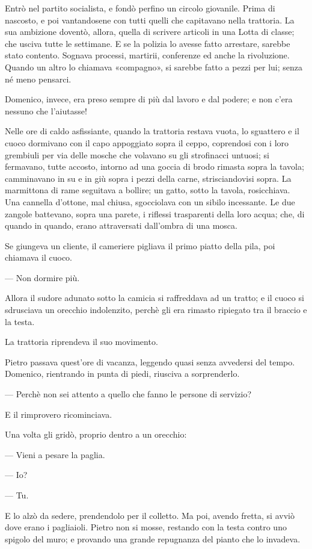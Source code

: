 Entrò nel partito socialista, e fondò perfino un circolo giovanile. Prima di nascosto, e poi vantandosene con tutti quelli che capitavano nella trattoria. La sua ambizione doventò, allora, quella di scrivere articoli in una Lotta di classe; che usciva tutte le settimane. E se la polizia lo avesse fatto arrestare, sarebbe stato contento. Sognava processi, martirii, conferenze ed anche la rivoluzione. Quando un altro lo chiamava «compagno», si sarebbe fatto a pezzi per lui; senza né meno pensarci.

Domenico, invece, era preso sempre di più dal lavoro e dal podere; e non c’era nessuno che l’aiutasse!

Nelle ore di caldo asfissiante, quando la trattoria restava vuota, lo sguattero e il cuoco dormivano con il capo appoggiato sopra il ceppo, coprendosi con i loro grembiuli per via delle mosche che volavano su gli strofinacci untuosi; si fermavano, tutte accosto, intorno ad una goccia di brodo rimasta sopra la tavola; camminavano in su e in giù sopra i pezzi della carne, strisciandovisi sopra. La marmittona di rame seguitava a bollire; un gatto, sotto la tavola, rosicchiava. Una cannella d’ottone, mal chiusa, sgocciolava con un sibilo incessante. Le due zangole battevano, sopra una parete, i riflessi trasparenti della loro acqua; che, di quando in quando, erano attraversati dall’ombra di una mosca.

Se giungeva un cliente, il cameriere pigliava il primo piatto della pila, poi chiamava il cuoco.

— Non dormire più.

Allora il sudore adunato sotto la camicia si raffreddava ad un tratto; e il cuoco si sdrusciava un orecchio indolenzito, perchè gli era rimasto ripiegato tra il braccio e la testa.

La trattoria riprendeva il suo movimento.

Pietro passava quest’ore di vacanza, leggendo quasi senza avvedersi del tempo. Domenico, rientrando in punta di piedi, riusciva a sorprenderlo.

— Perchè non sei attento a quello che fanno le persone di servizio?

E il rimprovero ricominciava.

Una volta gli gridò, proprio dentro a un orecchio:

— Vieni a pesare la paglia.

— Io?

— Tu.

E lo alzò da sedere, prendendolo per il colletto. Ma poi, avendo fretta, si avviò dove erano i pagliaioli. Pietro non si mosse, restando con la testa contro uno spigolo del muro; e provando una grande repugnanza del pianto che lo invadeva.

